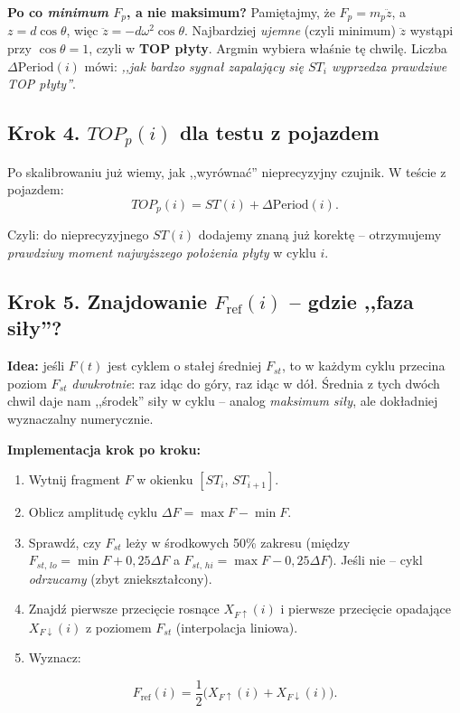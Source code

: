 \documentclass[11pt,a4paper]{article}
\theoremstyle{plainpol}
\begin{document}
\begin{intuicja}
\textbf{Po co \emph{minimum} $F_p$, a nie maksimum?} Pamiętajmy, że
$F_p = m_p\ddot{z}$, a $z = d\cos\theta$, więc $\ddot{z} = -d\omega^2\cos\theta$.
Najbardziej \emph{ujemne} (czyli minimum) $\ddot{z}$ wystąpi przy
$\cos\theta = 1$, czyli w \textbf{TOP płyty}. Argmin wybiera właśnie tę
chwilę. Liczba $\Delta\mathrm{Period}(i)$ mówi: \emph{,,jak bardzo
sygnał zapalający się $ST_i$ wyprzedza prawdziwe TOP płyty''}.
\end{intuicja}

\subsection{Krok 4. $TOP_p(i)$ dla testu z pojazdem}

Po skalibrowaniu już wiemy, jak ,,wyrównać'' nieprecyzyjny czujnik.
W teście z pojazdem:
\begin{equation}
  TOP_p(i) = ST(i) + \Delta\mathrm{Period}(i).
  \label{eq:TOPp}
\end{equation}

Czyli: do nieprecyzyjnego $ST(i)$ dodajemy znaną już korektę -- otrzymujemy
\emph{prawdziwy moment najwyższego położenia płyty} w cyklu $i$.

\subsection{Krok 5. Znajdowanie $F_{\mathrm{ref}}(i)$ -- gdzie ,,faza siły''?}

\textbf{Idea:} jeśli $F(t)$ jest cyklem o stałej średniej $F_{st}$, to
w każdym cyklu przecina poziom $F_{st}$ \emph{dwukrotnie}: raz idąc do
góry, raz idąc w dół. Średnia z tych dwóch chwil daje nam ,,środek''
siły w cyklu -- analog \emph{maksimum siły}, ale dokładniej
wyznaczalny numerycznie.

\textbf{Implementacja krok po kroku:}
\begin{enumerate}
  \item Wytnij fragment $F$ w okienku $[ST_i,\,ST_{i+1}]$.
  \item Oblicz amplitudę cyklu $\Delta F = \max F - \min F$.
  \item Sprawdź, czy $F_{st}$ leży w środkowych 50\% zakresu (między
    $F_{st,\,lo} = \min F + 0{,}25\Delta F$ a
    $F_{st,\,hi} = \max F - 0{,}25\Delta F$). Jeśli nie -- cykl
    \emph{odrzucamy} (zbyt zniekształcony).
  \item Znajdź pierwsze przecięcie rosnące $X_{F\uparrow}(i)$ i pierwsze
    przecięcie opadające $X_{F\downarrow}(i)$ z poziomem $F_{st}$
    (interpolacja liniowa).
  \item Wyznacz:
\end{enumerate}
\begin{equation}
  F_{\mathrm{ref}}(i) = \dfrac{1}{2}\bigl(X_{F\uparrow}(i) + X_{F\downarrow}(i)\bigr).
  \label{eq:Fref}
\end{equation}
\end{document}
